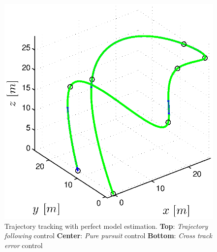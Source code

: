 \begin{figure}[h]
\begin{minipage}[t]{0.32\textwidth}
    \includegraphics[width = \textwidth]{trackings/figure_3D_agile_SplineDegree3_crossTrack_Disturbance_0}
  \end{minipage}
  \caption{Trajectory tracking with perfect model estimation. {\bf Top}: \textit{Trajectory following} control {\bf Center}: \textit{Pure pursuit} control {\bf Bottom}: \textit{Cross track error} control}
  \label{fig:results_perfect_model}
\end{figure}

